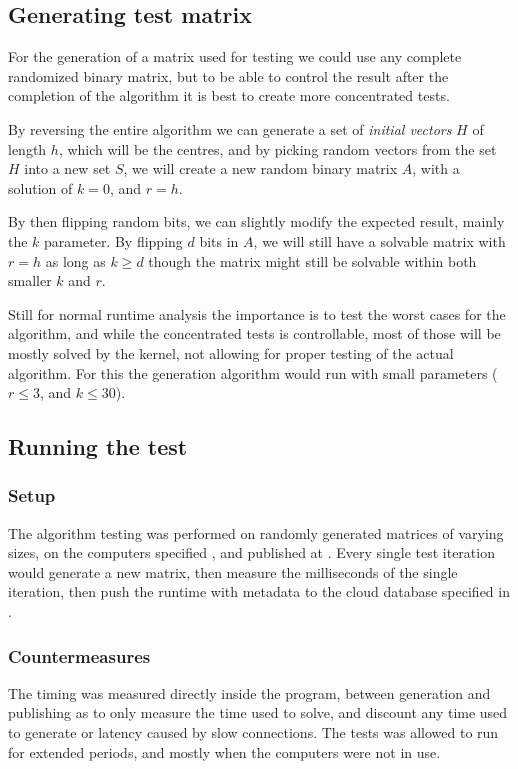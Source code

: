 \documentclass[a4paper]{article}
\begin{document}
\subsection{Generating test matrix}
For the generation of a matrix used for testing we could use any complete randomized binary
matrix, but to be able to control the result after the completion of the algorithm it is best
to create more concentrated tests.

By reversing the entire algorithm we can generate a set of \textit{initial vectors} $H$ of length $h$, 
which will be the centres, and by picking random vectors from the set $H$ into a new set $S$,
we will create a new random binary matrix $A$, with a solution of $k=0$, and $r=h$. 

By then flipping random bits, we can slightly modify the expected result, mainly
the $k$ parameter. By flipping $d$ bits in $A$, we will still have a solvable matrix
with $r = h$ as long as $k \geq d$ though the matrix might still be solvable within both
smaller $k$ and $r$.



Still for normal runtime analysis the importance is to test the worst cases for the algorithm,
and while the concentrated tests is controllable, most of those will be mostly solved by the
kernel, not allowing for proper testing of the actual algorithm. For this the generation
algorithm would run with small parameters ($r \leq 3$, and $k \leq 30$).

\subsection{Running the test}
\subsubsection{Setup}
The algorithm testing was performed on randomly generated matrices of varying sizes, on the computers
specified , and published at \cite{datastudio_results}.
Every single test iteration would generate a new matrix, then measure the
milliseconds of the single iteration, then push the runtime with metadata to the cloud database specified
in .

\subsubsection{Countermeasures}
The timing was measured directly inside the program, between generation and publishing as to only measure
the time used to solve, and discount any time used to generate or latency caused by slow connections. The tests
was allowed to run for extended periods, and mostly when the computers were not in use.
\end{document}
